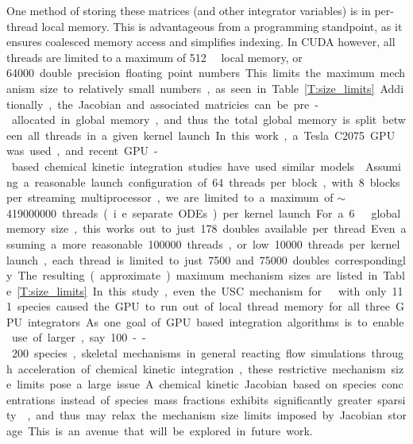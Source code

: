 \documentclass[preprint]{elsarticle}
\begin{document}
One method of storing these matrices (and other integrator variables) is in per-thread local memory.
This is advantageous from a programming standpoint, as it ensures coalesced memory access and simplifies indexing.
In CUDA however, all threads are limited to a maximum of \SI{512}{\kilo\byte} local memory, or \SI{64000} double precision floating point numbers.
This limits the maximum mechanism size to relatively small numbers, as seen in Table~\ref{T:size_limits}.

Additionally, the Jacobian and associated matricies can be pre-allocated in global memory, and thus the total global memory is split between all threads in a given kernel launch.
In this work, a Tesla C2075 GPU was used, and recent GPU-based chemical kinetic integration studies have used similar models~\cite{Shi:2011aa,Niemeyer:2011aa,Shi:2012aa,Le2013596,Stone:2013aa,Niemeyer:2014aa}
Assuming a reasonable launch configuration of \SI{64} threads per block, with \SI{8} blocks per streaming multiprocessor, we are limited to a maximum of $\sim$ \SI{419000000} threads (i.e. separate ODEs) per kernel launch.
For a \SI{6}{\giga\byte} global memory size, this works out to just \SI{178} doubles available per thread.
Even assuming a more reasonable \SI{100000} threads, or low \SI{10000} threads per kernel launch, each thread is limited to just \SI{7500} and \SI{75000} doubles correspondingly.
The resulting (approximate) maximum mechanism sizes are listed in Table~\ref{T:size_limits}.

In this study, even the USC mechanism for ~\cite{Wang:2007} with only 111 species caused the GPU to run out of local thread memory for all three GPU integrators.
As one goal of GPU based integration algorithms is to enable use of larger, say 100--200 species, skeletal mechanisms in general reacting flow simulations through acceleration of chemical kinetic integration, these restrictive mechanism size limits pose a large issue.
A chemical kinetic Jacobian based on species concentrations instead of species mass fractions exhibits significantly greater sparsity~\cite{Lu:2009gh}, and thus may relax the mechanism size limits imposed by Jacobian storage.
This is an avenue that will be explored in future work.
\end{document}
